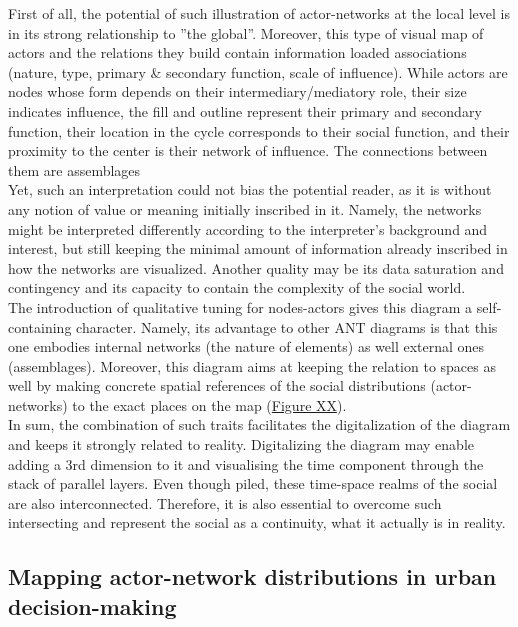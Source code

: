 \documentclass[11pt]{report}
\begin{document}
First of all, the potential of such illustration of actor-networks at the local level is in its strong relationship to ”the global”. Moreover, this type of  visual map of actors and the relations they build contain information loaded associations (nature, type, primary \& secondary function, scale of influence).
While actors are nodes whose form depends on their intermediary/mediatory role, their size indicates influence, the fill and outline represent their primary and secondary function, their location in the cycle corresponds to their social function, and their proximity to the center is their network of influence.
The connections between them are assemblages
\\

Yet, such an interpretation could not bias the potential reader, as it is without any notion of value or meaning initially inscribed in it. Namely, the networks might be interpreted differently according to the interpreter’s background and interest, but still keeping the minimal amount of information already inscribed in how the networks are visualized. Another quality may be its data saturation and contingency and its capacity to contain the complexity of the social world.
\\

The introduction of qualitative tuning for nodes-actors gives this diagram a self-containing character. Namely, its advantage to other ANT diagrams is that this one embodies internal networks (the nature of elements) as well external ones (assemblages). Moreover, this diagram aims at keeping the relation to spaces as well by making concrete spatial references of the social distributions (actor-networks) to the exact places on the map (\href{ref}{Figure XX}).
\\

In sum, the combination of such traits facilitates the digitalization of the diagram and keeps it strongly related to reality.  Digitalizing the diagram may enable adding a 3rd dimension to it and visualising the time component through the stack of parallel layers. Even though piled, these time-space realms of the social are also interconnected. Therefore, it is also essential to overcome such intersecting and represent the social as a continuity, what it actually is in reality. 
  
\subsection{Mapping actor-network distributions in urban decision-making}
\end{document}
